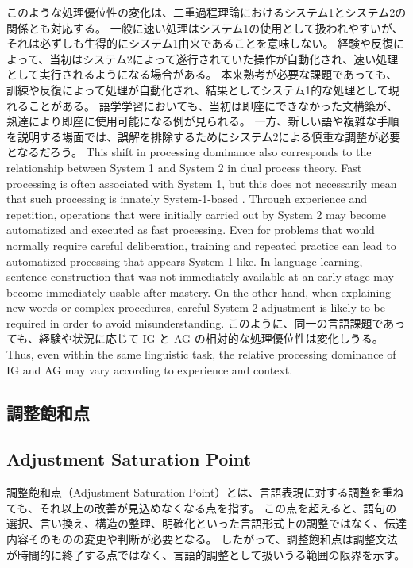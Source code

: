 \documentclass[a4paper]{article}
\begin{document}
\ifJPN
このような処理優位性の変化は、二重過程理論におけるシステム1とシステム2の関係とも対応する。
一般に速い処理はシステム1の使用として扱われやすいが、それは必ずしも生得的にシステム1由来であることを意味しない\autocite{Kahneman2011-KAHTFA-2,Evans2008}。
経験や反復によって、当初はシステム2によって遂行されていた操作が自動化され、速い処理として実行されるようになる場合がある\autocite{Evans2008}。  
本来熟考が必要な課題であっても、訓練や反復によって処理が自動化され、結果としてシステム1的な処理として現れることがある。  
語学学習においても、当初は即座にできなかった文構築が、熟達により即座に使用可能になる例が見られる。  
一方、新しい語や複雑な手順を説明する場面では、誤解を排除するためにシステム2による慎重な調整が必要となるだろう。  
\else
This shift in processing dominance also corresponds to the relationship between System 1 and System 2 in dual process theory.
Fast processing is often associated with System 1, but this does not necessarily mean that such processing is innately System-1-based
\autocite{Kahneman2011-KAHTFA-2,Evans2008}.
Through experience and repetition, operations that were initially carried out by System 2 may become automatized and executed as fast processing.\autocite{Evans2008}
Even for problems that would normally require careful deliberation, training and repeated practice can lead to automatized processing that appears System-1-like.
In language learning, sentence construction that was not immediately available at an early stage may become immediately usable after mastery.
On the other hand, when explaining new words or complex procedures, careful System 2 adjustment is likely to be required in order to avoid misunderstanding.
\fi
\ifJPN
このように、同一の言語課題であっても、経験や状況に応じて IG と AG の相対的な処理優位性は変化しうる。
\else
Thus, even within the same linguistic task, the relative processing dominance of IG and AG may vary according to experience and context.
\fi

\ifJPN
  \subsection{調整飽和点}
\else
  \subsection{Adjustment Saturation Point}
\fi

\ifJPN
調整飽和点（Adjustment Saturation Point）とは、言語表現に対する調整を重ねても、それ以上の改善が見込めなくなる点を指す。
この点を超えると、語句の選択、言い換え、構造の整理、明確化といった言語形式上の調整ではなく、伝達内容そのものの変更や判断が必要となる。
したがって、調整飽和点は調整文法が時間的に終了する点ではなく、言語的調整として扱いうる範囲の限界を示す。
\end{document}

